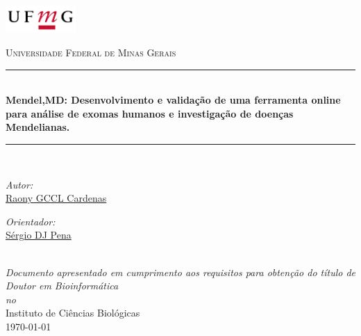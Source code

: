 \documentclass[
	12pt,				%
	openany,			%
	oneside,			%
	a4paper,			%
	english,			%
	brazil,				%
	]{abntex2}
\newcommand{\HRule}{\rule{\linewidth}{0.5mm}} %
\begin{document}
\frontmatter
\frenchspacing 


\begin{center}

\includegraphics[width=0.2\textwidth]{./Pictures/Logo_UFMG.jpg}



\textsc{\LARGE Universidade Federal de Minas Gerais}\\[1.5cm] %
\HRule \\[0.4cm] %
{\huge \textbf{Mendel,MD: Desenvolvimento e validação de uma ferramenta online para análise de exomas humanos e investigação de doenças Mendelianas.} }\\[0.4cm] %
\HRule \\[1.5cm] %
\vspace{6em}

\begin{minipage}{0.4\textwidth}
\begin{flushleft} \large
\emph{Autor:}\\
\href{http://lattes.cnpq.br/0263349039132540}{Raony GCCL Cardenas} %
\end{flushleft}
\end{minipage}
\begin{minipage}{0.4\textwidth}
\begin{flushright} \large
\emph{Orientador:} \\
\href{http://lattes.cnpq.br/5969241975196292}{Sérgio DJ Pena} %
\end{flushright}
\end{minipage}\\[1cm]
 
\large \textit{Documento apresentado em cumprimento aos requisitos para obtenção do título de  Doutor em Bioinformática}\\[0.3cm] %
\textit{no}\\[0.4cm]
Instituto de Ciências Biológicas\\[2cm] %
{\large \today}\\[4cm] %
\vfill
\clearpage %


\end{center}
\end{document}
